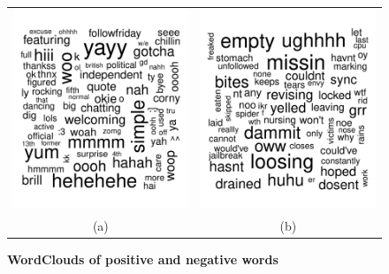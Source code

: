 \documentclass{sig-alternate}
\begin{document}
\begin{figure}[ht]
\begin{center}
\begin{tabular}{cc}
\includegraphics[scale=0.25]{poswords.pdf}
&
\includegraphics[scale=0.25]{negwords.pdf}\\
(a) & (b)  
\end{tabular}
\caption{\textbf{WordClouds of positive and negative words }}
\label{fig:scatter}
\end{center}
\end{figure}
\end{document}
